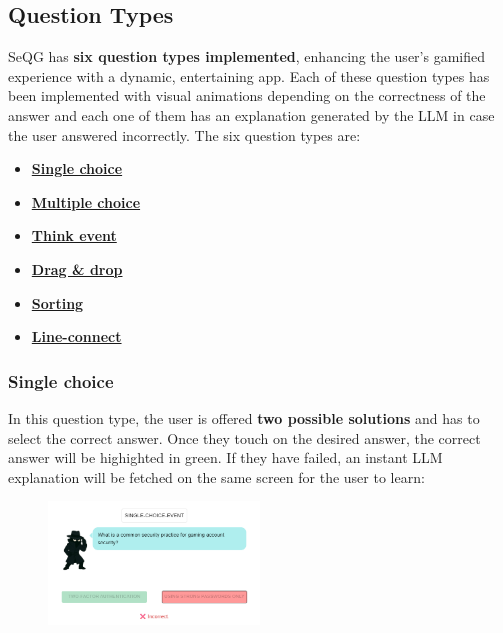 \subsection{Question Types}
SeQG has \textbf{six question types implemented}, enhancing the user's gamified experience with a dynamic, entertaining
app. Each of these question types has been implemented with visual animations depending on the correctness of
the answer and each one of them has an explanation generated by the LLM in case the user answered incorrectly.
The six question types are:
\begin{itemize}[nosep]
    \item \hyperref[qt:single]{\textbf{Single choice}}
    \item \hyperref[qt:multiple]{\textbf{Multiple choice}}
    \item \hyperref[qt:think]{\textbf{Think event}}
    \item \hyperref[qt:dad]{\textbf{Drag \& drop}}
    \item \hyperref[qt:sort]{\textbf{Sorting}}
    \item \hyperref[qt:line]{\textbf{Line-connect}}
\end{itemize}

\pagebreak
\subsubsection{Single choice}\label{qt:single}
In this question type, the user is offered \textbf{two possible solutions} and has to select the correct answer. Once they
touch on the desired answer, the correct answer will be highighted in green. If they have failed, an instant LLM explanation
will be fetched on the same screen for the user to learn:
\begin{figure}[htbp]
    \centering
    \includegraphics[width=0.5\textwidth]{images/Single_Choice.png}
\end{figure}

